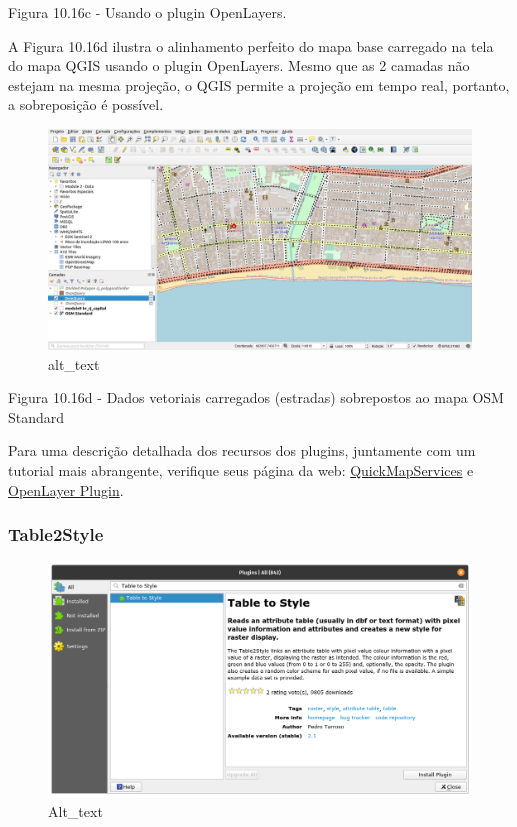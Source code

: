 \documentclass[
]{book}
\begin{document}
Figura 10.16c - Usando o plugin OpenLayers.

A Figura 10.16d ilustra o alinhamento perfeito do mapa base carregado na tela do mapa QGIS usando o plugin OpenLayers. Mesmo que as 2 camadas não estejam na mesma projeção, o QGIS permite a projeção em tempo real, portanto, a sobreposição é possível.

\begin{figure}
\centering
\includegraphics{media/modulo10/fig1016_d.png}
\caption{alt\_text}
\end{figure}

Figura 10.16d - Dados vetoriais carregados (estradas) sobrepostos ao mapa OSM Standard

Para uma descrição detalhada dos recursos dos plugins, juntamente com um tutorial mais abrangente, verifique seus página da web: \href{https://nextgis.com/blog/quickmapservices/}{QuickMapServices} e \href{https://github.com/sourcepole/qgis-openlayers-plugin}{OpenLayer Plugin}.

\hypertarget{table2style}{%
\subsubsection{\texorpdfstring{\textbf{Table2Style}}{Table2Style}}\label{table2style}}

\begin{figure}
\centering
\includegraphics{media/modulo10/fig1017_a.png}
\caption{Alt\_text}
\end{figure}
\end{document}
